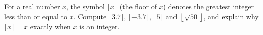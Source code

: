 For a real number $x$, the symbol $\lfloor x\rfloor$ (the floor of $x$) denotes the greatest integer less than or equal to $x$. Compute $\lfloor3.7\rfloor$, $\lfloor-3.7\rfloor$, $\lfloor5\rfloor$ and $\left\lfloor\sqrt{50}\right\rfloor$, and explain why $\lfloor x\rfloor=x$ exactly when $x$ is an integer.
